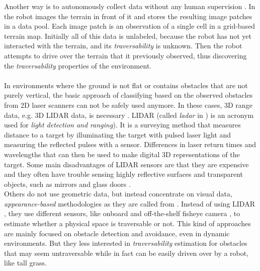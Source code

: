\documentclass[12pt,a4paper]{report}
\newcommand{\term}{\textit}
\newcommand{\acronym}{\MakeUppercase}
\begin{document}
	Another way is to autonomously collect data without any human supervision 
	\cite{Kim, Lee}. In \cite{Kim} the robot images the terrain in front of it and 
	stores the resulting image patches in a data pool. Each image patch is an 
	observation of a single cell in a grid-based terrain map. Initially all of this 
	data is unlabeled, because the robot has not yet interacted with the terrain, and 
	its \term{traversability} is unknown. Then the robot attempts to drive over the 
	terrain that it previously observed, thus discovering the \term{traversability} 
	properties of the environment.
	\\\\
	
	In environments where the ground is not flat or contains obstacles that are 
	not purely vertical, the basic approach of classifying based on the observed 
	obstacles from \acronym{2d} laser scanners can not be safely used anymore. 
	In these cases, \acronym{3d} range data, e.g. \acronym{3d} \acronym{lidar} 
	data, is necessary \cite{Suger, Lalonde}. \acronym{lidar} (called \term{ladar} 
	in \cite{Lalonde, Shneier}) is an acronym used for \term{light detection and 
	ranging}). It is a surveying method that measures distance to a target by 
	illuminating the target with pulsed laser light and measuring the reflected 
	pulses with a sensor. Differences in laser return times and wavelengths that 
	can then be used to make digital \acronym{3d} representations of the target.
	Some main disadvantages of \acronym{lidar} sensors are that they are expensive 
	and they often have trouble sensing highly reflective surfaces and transparent 
	objects, such as mirrors and glass doors \cite{HiroseGonet}.
	\\
	
	Others do not use geometric data, but instead concentrate on visual data, 
	\term{appearance-based} methodologies as they are called from \cite{Papadakis}. 
	Instead of using \acronym{lidar} \cite{Lalonde, Suger}, they use different 
	sensors, like onboard and off-the-shelf fisheye camera \cite{Hirose, HiroseGonet}, 
	to estimate whether a physical space is traversable or not. This kind of 
	approaches are mainly focused on obstacle detection and avoidance, even in 
	dynamic environments. But they less interested in \term{traversability} 
	estimation for obstacles that may seem untraversable while in fact can be 
	easily driven over by a robot, like tall grass.
	\\
	
\end{document}
